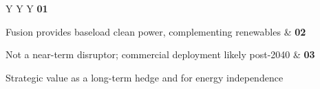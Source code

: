 \documentclass[10pt,a4paper]{article}
\begin{document}
\vspace{5pt}\noindent\begin{tabularx}{\linewidth}{Y Y Y}
{\textcolor{BOGreen}{\bfseries 01}}\par{\scriptsize\color{BOText} Fusion provides baseload clean power, complementing renewables} & {\textcolor{BOGreen}{\bfseries 02}}\par{\scriptsize\color{BOText} Not a near-term disruptor; commercial deployment likely post-2040} & {\textcolor{BOGreen}{\bfseries 03}}\par{\scriptsize\color{BOText} Strategic value as a long-term hedge and for energy independence} \\
\end{tabularx}\par\vspace{2pt}
\label{chap:5:end}
\end{document}
